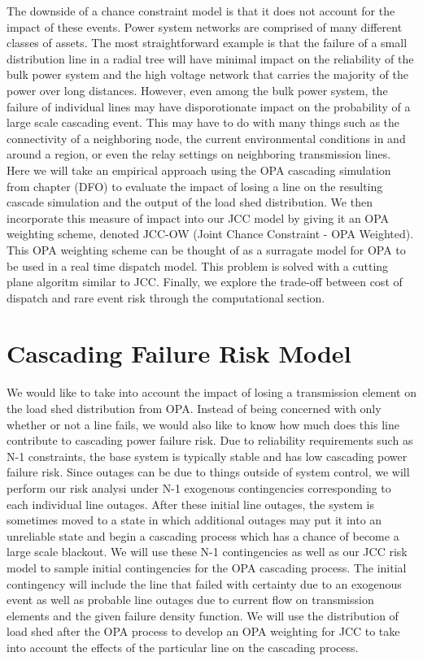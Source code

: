 The downside of a chance constraint model is that it does not account for the impact of these events.  Power system networks are comprised of many different classes of assets.  The most straightforward example is that the failure of a small distribution line in a radial tree will have minimal impact on the reliability of the bulk power system and the high voltage network that carries the majority of the power over long distances.  However, even among the bulk power system, the failure of individual lines may have disporotionate impact on the probability of a large scale cascading event.  This may have to do with many things such as the connectivity of a neighboring node, the current environmental conditions in and around a region, or even the relay settings on neighboring transmission lines.  Here we will take an empirical approach using the OPA cascading simulation from chapter (DFO) to evaluate the impact of losing a line on the resulting cascade simulation and the output of the load shed distribution.  We then incorporate this measure of impact into our JCC model by giving it an OPA weighting scheme, denoted JCC-OW (Joint Chance Constraint - OPA Weighted).  This OPA weighting scheme can be thought of as a surragate model for OPA to be used in a real time dispatch model.  This problem is solved with a cutting plane algoritm similar to JCC.  Finally, we explore the trade-off between cost of dispatch and rare event risk through the computational section.




\section{Cascading Failure Risk Model}
We would like to take into account the impact of losing a transmission element on the load shed distribution from OPA.  Instead of being concerned with only whether or not a line fails, we would also like to know how much does this line contribute to cascading power failure risk.  Due to reliability requirements such as N-1 constraints, the base system is typically stable and has low cascading power failure risk.  Since outages can be due to things outside of system control, we will perform our risk analysi under N-1 exogenous contingencies corresponding to each individual line outages.  After these initial line outages, the system is sometimes moved to a state in which additional outages may put it into an unreliable state and begin a cascading process which has a chance of become a large scale blackout.  We will use these N-1 contingencies as well as our JCC risk model to sample initial contingencies for the OPA cascading process.  The initial contingency will include the line that failed with certainty due to an exogenous event as well as probable line outages due to current flow on transmission elements and the given failure density function.  We will use the distribution of load shed after the OPA process to develop an OPA weighting for JCC to take into account the effects of the particular line on the cascading process. 

